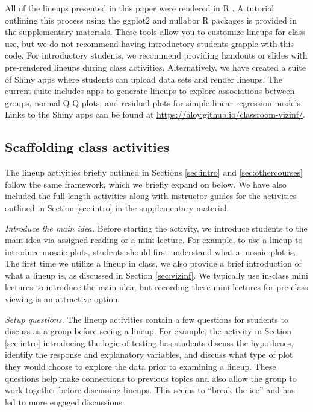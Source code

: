 \documentclass[12pt]{article}
\begin{document}
All of the lineups presented in this paper were rendered in R \citep{r}.
A tutorial outlining this process using the ggplot2 \citep{ggplot2} and
nullabor \citep{nullabor} R packages is provided in the supplementary
materials. These tools allow you to customize lineups for class use, but
we do not recommend having introductory students grapple with this code.
For introductory students, we recommend providing handouts or slides
with pre-rendered lineups during class activities. Alternatively, we
have created a suite of Shiny apps \citep{shiny} where students can
upload data sets and render lineups. The current suite includes apps to
generate lineups to explore associations between groups, normal Q-Q
plots, and residual plots for simple linear regression models. Links to
the Shiny apps can be found at
\url{https://aloy.github.io/classroom-vizinf/}.

\hypertarget{scaffolding-class-activities}{%
\subsection{Scaffolding class
activities}\label{scaffolding-class-activities}}

The lineup activities briefly outlined in Sections \ref{sec:intro} and
\ref{sec:othercourses} follow the same framework, which we briefly
expand on below. We have also included the full-length activities along
with instructor guides for the activities outlined in Section
\ref{sec:intro} in the supplementary material.

\emph{Introduce the main idea.} Before starting the activity, we
introduce students to the main idea via assigned reading or a mini
lecture. For example, to use a lineup to introduce mosaic plots,
students should first understand what a mosaic plot is. The first time
we utilize a lineup in class, we also provide a brief introduction of
what a lineup is, as discussed in Section \ref{sec:vizinf}. We typically
use in-class mini lectures to introduce the main idea, but recording
these mini lectures for pre-class viewing is an attractive option.

\emph{Setup questions.} The lineup activities contain a few questions
for students to discuss as a group before seeing a lineup. For example,
the activity in Section \ref{sec:intro} introducing the logic of testing
has students discuss the hypotheses, identify the response and
explanatory variables, and discuss what type of plot they would choose
to explore the data prior to examining a lineup. These questions help
make connections to previous topics and also allow the group to work
together before discussing lineups. This seems to ``break the ice'' and
has led to more engaged discussions.
\end{document}
